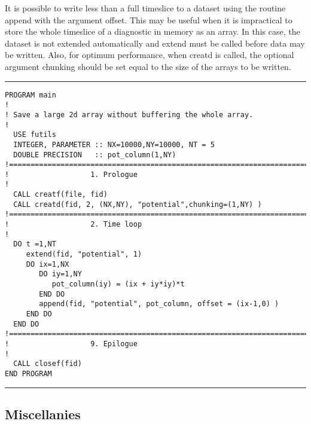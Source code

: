 \documentclass[a4paper]{article}
\begin{document}
It is possible to write less than a full timeslice to a dataset using the
routine {\ttfamily append} with the argument offset. This may be useful when it is
impractical to store the whole timeslice of a diagnostic in memory as an
array. In this case, the dataset is not extended automatically and
{\ttfamily extend} must be called before data may be written.
Also, for optimum performance, when {\ttfamily creatd} is called, the optional argument
{\ttfamily chunking} should be set equal to the size of the arrays to be written.
\par
\addvspace{\medskipamount}
\nopagebreak\hrule
\begin{verbatim}
PROGRAM main
!
! Save a large 2d array without buffering the whole array.
!
  USE futils
  INTEGER, PARAMETER :: NX=10000,NY=10000, NT = 5
  DOUBLE PRECISION   :: pot_column(1,NY)
!===========================================================================
!                   1. Prologue
!
  CALL creatf(file, fid)
  CALL creatd(fid, 2, (NX,NY), "potential",chunking=(1,NY) )
!===========================================================================
!                   2. Time loop
!
  DO t =1,NT
     extend(fid, "potential", 1)
     DO ix=1,NX
        DO iy=1,NY
           pot_column(iy) = (ix + iy*iy)*t
        END DO
        append(fid, "potential", pot_column, offset = (ix-1,0) )
     END DO
  END DO
!===========================================================================
!                   9. Epilogue
!
  CALL closef(fid)
END PROGRAM
\end{verbatim}
\nopagebreak\hrule
\addvspace{\medskipamount}





\subsection{Miscellanies}
\end{document}
